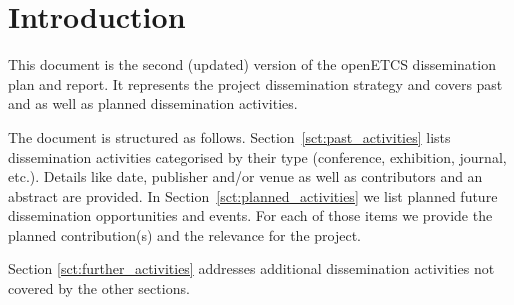\section{Introduction}

This document is the second (updated) version of the openETCS dissemination plan and report. It represents the project dissemination strategy and covers past and as well as planned dissemination activities.

The document is structured as follows. Section~\ref{sct:past_activities} lists dissemination activities categorised by their type (conference, exhibition, journal, etc.). Details like date, publisher and/or venue as well as contributors and an abstract are provided. In Section~\ref{sct:planned_activities} we list planned future dissemination opportunities and events. For each of those items we provide the planned contribution(s) and the relevance for the project.

Section \ref{sct:further_activities} addresses additional dissemination activities not covered by the other sections.

